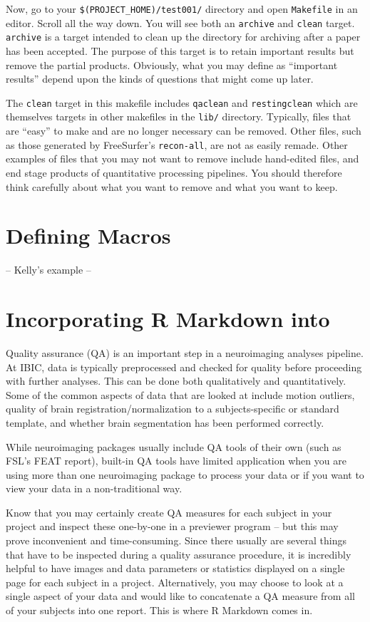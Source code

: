 Now, go to your \texttt{\$(PROJECT_HOME)/test001/} directory and open \texttt{Makefile} in an editor. Scroll all the way down. You will see both an \texttt{archive} and \texttt{clean} target. \texttt{archive} is a target intended to clean up the directory for archiving after a paper has been accepted. The purpose of this target is to retain important results but remove the partial products. Obviously, what you may define as ``important results'' depend upon the kinds of questions that might come up later. 

The \texttt{clean} target in this makefile includes \texttt{qaclean} and \texttt{restingclean} which are themselves targets in other makefiles in the \texttt{lib/} directory. Typically, files that are ``easy'' to make and are no longer necessary can be removed. Other files, such as those generated by FreeSurfer's \texttt{recon-all}, are not as easily remade. Other examples of files that you may not want to remove include hand-edited files, and end stage products of quantitative processing pipelines. You should therefore think carefully about what you want to remove and what you want to keep. 

\section{Defining Macros}
-- Kelly's example --


\section{Incorporating R Markdown into \maken{}}

Quality assurance (QA) is an important step in a neuroimaging analyses pipeline. At IBIC, data is typically preprocessed and checked for quality before proceeding with further analyses. This can be done both qualitatively and quantitatively. Some of the common aspects of data that are looked at include motion outliers, quality of brain registration/normalization to a subjects-specific or standard template, and whether brain segmentation has been performed correctly. 

While neuroimaging packages usually include QA tools of their own (such as FSL's FEAT report), built-in QA tools have limited application when you are using more than one neuroimaging package to process your data or if you want to view your data in a non-traditional way. 

Know that you may certainly create QA measures for each subject in your project and inspect these one-by-one in a previewer program -- but this may prove inconvenient and time-consuming. Since there usually are several things that have to be inspected during a quality assurance procedure, it is incredibly helpful to have images and data parameters or statistics displayed on a single page for each subject in a project. Alternatively, you may choose to look at a single aspect of your data and would like to concatenate a QA measure from all of your subjects into one report. This is where R Markdown comes in.

